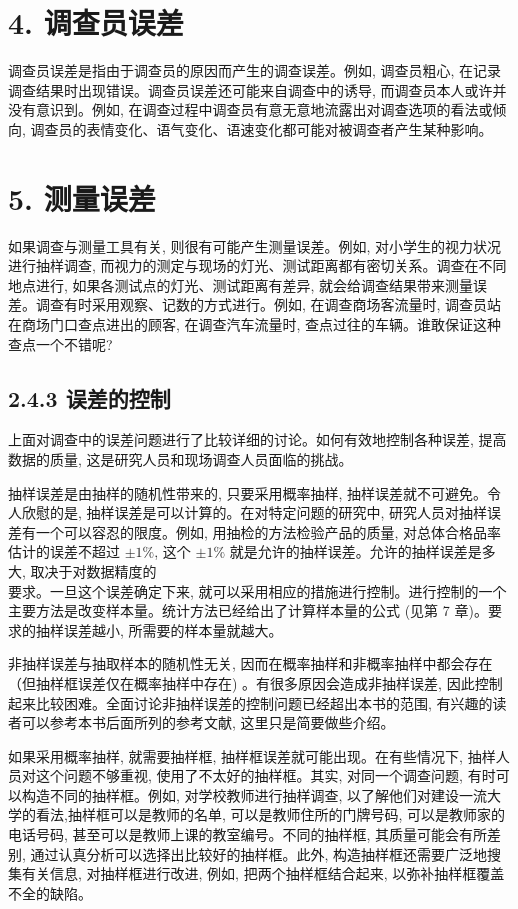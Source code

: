 \documentclass[10pt]{article}
\begin{document}
\begin{CJK*}{UTF8}{bsmi}
\section*{4. 调查员误差}
调查员误差是指由于调查员的原因而产生的调查误差。例如, 调查员粗心, 在记录调查结果时出现错误。调查员误差还可能来自调查中的诱导, 而调查员本人或许并没有意识到。例如, 在调查过程中调查员有意无意地流露出对调查选项的看法或倾向, 调查员的表情变化、语气变化、语速变化都可能对被调查者产生某种影响。

\section*{5. 测量误差}
如果调查与测量工具有关, 则很有可能产生测量误差。例如, 对小学生的视力状况进行抽样调查, 而视力的测定与现场的灯光、测试距离都有密切关系。调查在不同地点进行, 如果各测试点的灯光、测试距离有差异, 就会给调查结果带来测量误差。调查有时采用观察、记数的方式进行。例如, 在调查商场客流量时, 调查员站在商场门口查点进出的顾客, 在调查汽车流量时, 查点过往的车辆。谁敢保证这种查点一个不错呢?

\subsection*{2.4.3 误差的控制}
上面对调查中的误差问题进行了比较详细的讨论。如何有效地控制各种误差, 提高数据的质量, 这是研究人员和现场调查人员面临的挑战。

抽样误差是由抽样的随机性带来的, 只要采用概率抽样, 抽样误差就不可避免。令人欣慰的是, 抽样误差是可以计算的。在对特定问题的研究中, 研究人员对抽样误差有一个可以容忍的限度。例如, 用抽检的方法检验产品的质量, 对总体合格品率估计的误差不超过 $\pm 1 \%$, 这个 $\pm 1 \%$ 就是允许的抽样误差。允许的抽样误差是多大, 取决于对数据精度的\\
要求。一旦这个误差确定下来, 就可以采用相应的措施进行控制。进行控制的一个主要方法是改变样本量。统计方法已经给出了计算样本量的公式 (见第 7 章)。要求的抽样误差越小, 所需要的样本量就越大。

非抽样误差与抽取样本的随机性无关, 因而在概率抽样和非概率抽样中都会存在（但抽样框误差仅在概率抽样中存在) 。有很多原因会造成非抽样误差, 因此控制起来比较困难。全面讨论非抽样误差的控制问题已经超出本书的范围, 有兴趣的读者可以参考本书后面所列的参考文献, 这里只是简要做些介绍。

如果采用概率抽样, 就需要抽样框, 抽样框误差就可能出现。在有些情况下, 抽样人员对这个问题不够重视, 使用了不太好的抽样框。其实, 对同一个调查问题, 有时可以构造不同的抽样框。例如, 对学校教师进行抽样调查, 以了解他们对建设一流大学的看法,抽样框可以是教师的名单, 可以是教师住所的门牌号码, 可以是教师家的电话号码, 甚至可以是教师上课的教室编号。不同的抽样框, 其质量可能会有所差别, 通过认真分析可以选择出比较好的抽样框。此外, 构造抽样框还需要广泛地搜集有关信息, 对抽样框进行改进, 例如, 把两个抽样框结合起来, 以弥补抽样框覆盖不全的缺陷。


\end{CJK*}
\end{document}
